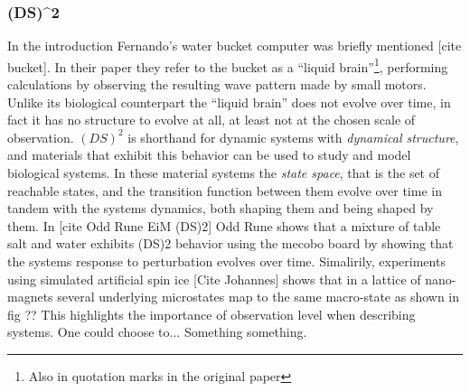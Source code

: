\subsubsection{(DS)^2}
%
In the introduction Fernando's water bucket computer was briefly mentioned [cite
bucket].
In their paper they refer to the bucket as a ``liquid brain''\footnote{Also in
  quotation marks in the original paper}, performing calculations by observing
the resulting wave pattern made by small motors.
Unlike its biological counterpart the ``liquid brain'' does not evolve over
time, in fact it has no structure to evolve at all, at least not at the chosen
scale of observation.
%
$(DS)^2$ is shorthand for dynamic systems with \emph{dynamical structure}, and
materials that exhibit this behavior can be used to study and model biological
systems.
In these material systems the \emph{state space}, that is the set of reachable
states, and the transition function between them evolve over time in tandem with
the systems dynamics, both shaping them and being shaped by them.
%
In [cite Odd Rune EiM (DS)2] Odd Rune shows that a mixture of table salt and
water exhibits (DS)2 behavior using the mecobo board by showing that the systems
response to perturbation evolves over time.
%
Simalirily, experiments using simulated artificial spin ice [Cite Johannes]
shows that in a lattice of nano-magnets several underlying microstates map to the
same macro-state as shown in fig ??
This highlights the importance of observation level when describing systems.
One could choose to... Something something.

